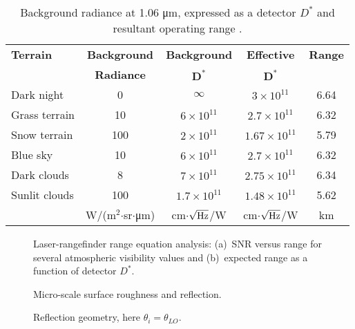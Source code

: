\begin{table}[tb]
\centering
\caption{Background radiance at 1.06 \si{\micro\metre}{}, expressed as a detector $D^\ast$ and resultant operating range \cite{Kaminski1980}.\label{tab:rangefinderperformance}}
\begin{tabular}{|l|c|c|c|c|}
\hline
\textbf{Terrain} & \textbf{Background} & \textbf{Background} & \textbf{Effective} & \textbf{Range} \\
         & \textbf{Radiance} &$\bm{D^\ast}$&$\bm{D^\ast}$ & \\
\hline
Dark night   & 0    & $\infty$               & $3\times10^{11}$ &6.64 \\
Grass terrain & 10 & $6\times10^{11}$ &$2.7\times10^{11}$ & 6.32\\
Snow terrain & 100 &$2\times10^{11}$ &$1.67\times10^{11}$ &5.79 \\
\hline
Blue sky & 10 &$6\times10^{11}$ &$2.7\times10^{11}$ & 6.32\\
Dark clouds & 8 &$7\times10^{11}$ &$2.75\times10^{11}$  &6.34 \\
Sunlit clouds & 100 & $1.7\times10^{11}$ &$1.48\times10^{11}$ &5.62 \\
\hline
& W/(m$^2$$\cdot$sr$\cdot$\si{\micro\metre}{}) & cm$\cdot$$\sqrt{\rm Hz}$/W & cm$\cdot$$\sqrt{\rm Hz}$/W  & km\colheightrule\\
\hline
\end{tabular}
\end{table}

\begin{figure}[tb]
\centering
{}
\caption
{\label{kamif}Laser-rangefinder range equation analysis: (a)~SNR versus range for several atmospheric visibility values and (b)~expected range as a function of detector $D^\ast$.}
\end{figure}


\begin{figure}[t]
\centering
{}
\caption{Micro-scale surface roughness and reflection.\label{nonlambert}}
\end{figure}

\begin{figure}[bt]
\centerline{}
\caption{Reflection geometry, here $\theta_i=\theta_{LO}$.\label{fig:specref}}
\end{figure}

